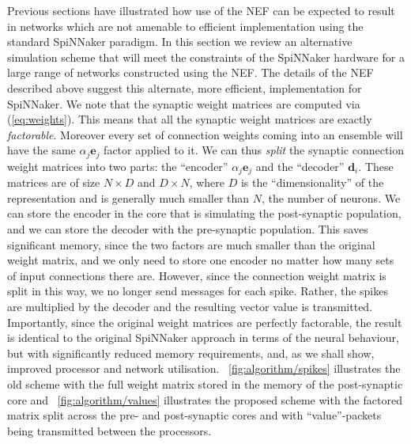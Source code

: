 \documentclass[conference]{IEEEtran}
\renewcommand{\vec}{\mathbf}  %
\begin{document}
  Previous sections have illustrated how use of the NEF can be expected to result in networks which are not amenable to efficient implementation using the standard SpiNNaker paradigm.
  In this section we review an alternative simulation scheme that will meet the constraints of the SpiNNaker hardware for a large range of networks constructed using the NEF.
  The details of the NEF described above suggest this alternate, more efficient, implementation for SpiNNaker.
  We note that the synaptic weight matrices are computed via (\ref{eq:weights}).
  This means that all the synaptic weight matrices are exactly \textit{factorable}.
  Moreover every set of connection weights coming into an ensemble will have the same $\alpha_j \vec{e}_j$ factor applied to it.
  We can thus \textit{split} the synaptic connection weight matrices into two parts: the ``encoder'' $\alpha_j \vec{e}_j$ and the ``decoder'' $\vec{d}_i$.
  These matrices are of size $N \times D$ and $D \times N$, where $D$ is the ``dimensionality'' of the representation and is generally much smaller than $N$, the number of neurons.
  We can store the encoder in the core that is simulating the post-synaptic population, and we can store the decoder with the pre-synaptic population.
  This saves significant memory, since the two factors are much smaller than the original weight matrix, and we only need to store one encoder no matter how many sets of input connections there are.
  However, since the connection weight matrix is split in this way, we no longer send messages for each spike.
  Rather, the spikes are multiplied by the decoder and the resulting vector value is transmitted.
  Importantly, since the original weight matrices are perfectly factorable, the result is identical to the original SpiNNaker approach in terms of the neural behaviour, but with significantly reduced memory requirements, and, as we shall show, improved processor and network utilisation.
  \figurename~\ref{fig:algorithm/spikes} illustrates the old scheme with the full weight matrix stored in the memory of the post-synaptic core and \figurename~\ref{fig:algorithm/values} illustrates the proposed scheme with the factored matrix split across the pre- and post-synaptic cores and with ``value''-packets being transmitted between the processors.
\end{document}
